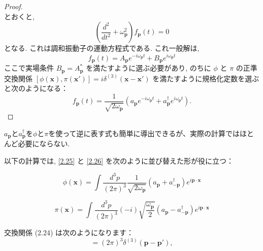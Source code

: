 \documentclass[a4paper,12pt]{article}
\begin{document}
\begin{proof}
\begin{equation*}
\end{equation*}
とおくと, 
\begin{equation*}\label{2-3.g7}
    \left( \frac{d^2}{dt^2} + \omega_{\mathbf{p}}^2 \right) f_{\mathbf{p}}(t) = 0 \tag{2-3.g7}
\end{equation*}
となる. これは調和振動子の運動方程式である. これ一般解は,
\begin{equation*}
    f_{\mathbf{p}}(t) = A_{\mathbf{p}} e^{-i\omega_{\mathbf{p}}t} + B_{\mathbf{p}} e^{i\omega_{\mathbf{p}}t} \tag{2-3.g9}
\end{equation*}
ここで実場条件 $B_{\mathbf{p}} = A_{\mathbf{p}}^*$ を満たすように選ぶ必要があり, のちに $\phi$ と $\pi$ の正準交換関係 $[\phi(\mathbf{x}), \pi(\mathbf{x}')] = i\delta^{(3)}(\mathbf{x} - \mathbf{x}')$ を満たすように規格化定数を選ぶと次のようになる：
\begin{equation*}
    f_{\mathbf{p}}(t) = \frac{1}{\sqrt{2\omega_{\mathbf{p}}}} \left( a_{\mathbf{p}} e^{-i\omega_{\mathbf{p}}t} + a^\dagger_{\mathbf{p}} e^{i\omega_{\mathbf{p}}t} \right). \tag{2-3.g10}
\end{equation*}




\end{proof}

\color{black}

$a_{\mathbf{p}}$と$a^\dagger_{\mathbf{p}}$を$\phi$と$\pi$を使って逆に表す式も簡単に導出できるが、実際の計算ではほとんど必要にならない.

以下の計算では, \eqref{2.25} と \eqref{2.26} を次のように並び替えた形が役に立つ：

\begin{equation}
\phi(\mathbf{x}) = \int \frac{d^3p}{(2\pi)^3} \frac{1}{\sqrt{2\omega_{\mathbf{p}}}} (a_{\mathbf{p}} + a^\dagger_{-\mathbf{p}}) e^{i\mathbf{p}\cdot\mathbf{x}}
\tag{2.27}
\end{equation}

\begin{equation}
\pi(\mathbf{x}) = \int \frac{d^3p}{(2\pi)^3} \left( -i \right) \sqrt{\frac{\omega_{\mathbf{p}}}{2}} (a_{\mathbf{p}} - a^\dagger_{-\mathbf{p}}) e^{i\mathbf{p}\cdot\mathbf{x}}
\tag{2.28}
\end{equation}

交換関係 (2.24) は次のようになります：
\begin{equation*}
[a_{\mathbf{p}}, a^\dagger_{\mathbf{p}'}] = (2\pi)^3 \delta^{(3)}(\mathbf{p} - \mathbf{p}') ,
\end{equation*}
\end{document}
